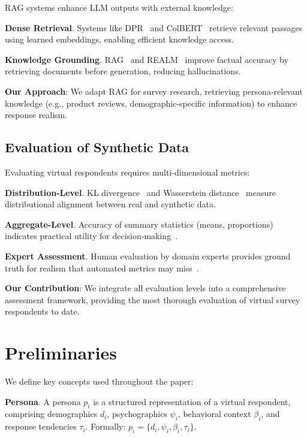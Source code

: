 \documentclass[sigconf,nonarchival]{acmart}
\begin{document}
RAG systems enhance LLM outputs with external knowledge:

\textbf{Dense Retrieval}. Systems like DPR~\cite{karpukhin2020dense} and ColBERT~\cite{khattab2020colbert} retrieve relevant passages using learned embeddings, enabling efficient knowledge access.

\textbf{Knowledge Grounding}. RAG~\cite{lewis2020retrieval} and REALM~\cite{guu2020realm} improve factual accuracy by retrieving documents before generation, reducing hallucinations.

\textbf{Our Approach}: We adapt RAG for survey research, retrieving persona-relevant knowledge (e.g., product reviews, demographic-specific information) to enhance response realism.

\subsection{Evaluation of Synthetic Data}

Evaluating virtual respondents requires multi-dimensional metrics:

\textbf{Distribution-Level}. KL divergence~\cite{kullback1951information} and Wasserstein distance~\cite{villani2008optimal} measure distributional alignment between real and synthetic data.

\textbf{Aggregate-Level}. Accuracy of summary statistics (means, proportions) indicates practical utility for decision-making~\cite{llms3}.

\textbf{Expert Assessment}. Human evaluation by domain experts provides ground truth for realism that automated metrics may miss~\cite{turing2024}.

\textbf{Our Contribution}: We integrate all evaluation levels into a comprehensive assessment framework, providing the most thorough evaluation of virtual survey respondents to date.


\section{Preliminaries}

We define key concepts used throughout the paper:

\textbf{Persona}. A persona $p_i$ is a structured representation of a virtual respondent, comprising demographics $d_i$, psychographics $\psi_i$, behavioral context $\beta_i$, and response tendencies $\tau_i$. Formally: $p_i = \{d_i, \psi_i, \beta_i, \tau_i\}$.
\end{document}
